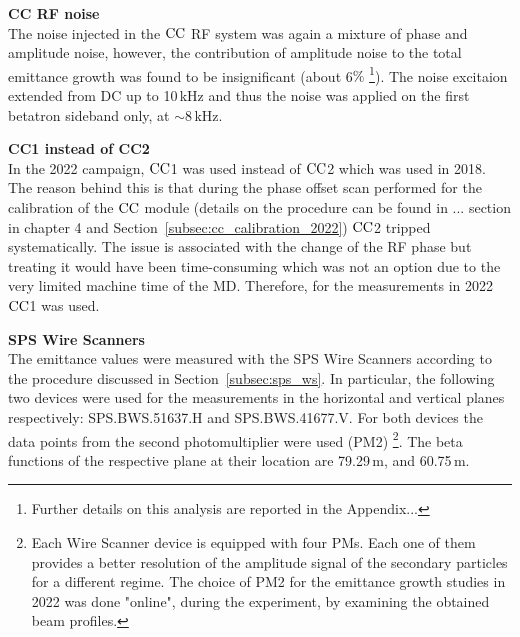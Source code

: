 \textbf{CC RF noise}\\
The noise injected in the ${\mathrm{CC}}$ RF system was again a mixture of phase and amplitude noise, however, the contribution of amplitude noise to the total emittance growth was found to be insignificant (about 6$\%$ \footnote{Further details on this analysis are reported in the Appendix...}). The noise excitaion extended from DC up to 10\,kHz and thus the noise was applied on the first betatron sideband only, at $\sim$8\,kHz.


\textbf{CC1 instead of CC2}\\
In the 2022 campaign, ${\mathrm{CC}}$1 was used instead of ${\mathrm{CC}}$2 which was used in 2018. The reason behind this is that during the phase offset scan performed for the calibration of the ${\mathrm{CC}}$ module (details on the procedure can be found in ... section in chapter 4 and  Section~\ref{subsec:cc_calibration_2022}) ${\mathrm{CC}}$2 tripped systematically. The issue is associated with the change of the RF phase but treating it would have been time-consuming which was not an option due to the very limited machine time of the MD. Therefore, for the measurements in 2022 ${\mathrm{CC}}$1 was used.

\textbf{SPS Wire Scanners}\\
The emittance values were measured with the SPS Wire Scanners according to the procedure discussed in Section~\ref{subsec:sps_ws}. In particular, the following two devices were used for the measurements in the horizontal and vertical planes respectively: SPS.BWS.51637.H and SPS.BWS.41677.V. For both devices the data points from the second photomultiplier were used (PM2) \footnote{Each Wire Scanner device is equipped with four PMs. Each one of them provides a better resolution of the amplitude signal of the secondary particles for a different regime. The choice of PM2 for the emittance growth studies in 2022 was done "online", during the experiment, by examining the obtained beam profiles.}. The beta functions of the respective plane at their location are 79.29\,m, and  60.75\,m. 

